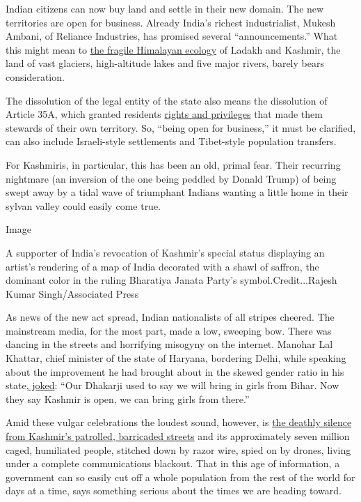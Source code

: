 Indian citizens can now buy land and settle in their new domain. The new
territories are open for business. Already India's richest
industrialist, Mukesh Ambani, of Reliance Industries, has promised
several ``announcements.'' What this might mean to
\href{https://www.nytimes.com/2018/12/01/opinion/himalayas-mountains-dams.html}{the
fragile Himalayan ecology} of Ladakh and Kashmir, the land of vast
glaciers, high-altitude lakes and five major rivers, barely bears
consideration.

The dissolution of the legal entity of the state also means the
dissolution of Article 35A, which granted residents
\href{https://www.aljazeera.com/news/2019/08/kashmir-special-status-explained-articles-370-35a-190805054643431.html}{rights
and privileges} that made them stewards of their own territory. So,
``being open for business,'' it must be clarified, can also include
Israeli-style settlements and Tibet-style population transfers.

For Kashmiris, in particular, this has been an old, primal fear. Their
recurring nightmare (an inversion of the one being peddled by Donald
Trump) of being swept away by a tidal wave of triumphant Indians wanting
a little home in their sylvan valley could easily come true.

Image

A supporter of India's revocation of Kashmir's special status displaying
an artist's rendering of a map of India decorated with a shawl of
saffron, the dominant color in the ruling Bharatiya Janata Party's
symbol.Credit...Rajesh Kumar Singh/Associated Press

As news of the new act spread, Indian nationalists of all stripes
cheered. The mainstream media, for the most part, made a low, sweeping
bow. There was dancing in the streets and horrifying misogyny on the
internet. Manohar Lal Khattar, chief minister of the state of Haryana,
bordering Delhi, while speaking about the improvement he had brought
about in the skewed gender ratio in his
state\href{https://twitter.com/manakgupta/status/1160083098253455360}{,
joked}: ``Our Dhakarji used to say we will bring in girls from Bihar.
Now they say Kashmir is open, we can bring girls from there.''

Amid these vulgar celebrations the loudest sound, however, is
\href{https://www.nytimes.com/2019/08/10/world/asia/kashmir-india-pakistan.html}{the
deathly silence from Kashmir's patrolled, barricaded streets} and its
approximately seven million caged, humiliated people, stitched down by
razor wire, spied on by drones, living under a complete communications
blackout. That in this age of information, a government can so easily
cut off a whole population from the rest of the world for days at a
time, says something serious about the times we are heading toward.

